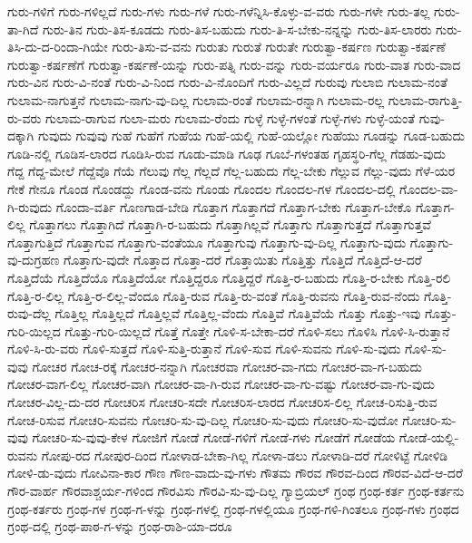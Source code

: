 {ಗುರು-ಗಳಿಗೆ
ಗುರು-ಗಳಿಲ್ಲದೆ
ಗುರು-ಗಳು
ಗುರು-ಗಳೆ
ಗುರು-ಗಳೆನ್ನಿಸಿ-ಕೊಳ್ಳು-ವ-ವರು
ಗುರು-ಗಳೇ
ಗುರು-ತಲ್ಲ
ಗುರು-ತಾ-ಗಿದೆ
ಗುರು-ತಿನ
ಗುರು-ತಿಸ-ಕೂಡದು
ಗುರು-ತಿಸ-ಬಹುದು
ಗುರು-ತಿ-ಸ-ಬೇಕು-ನನ್ನನ್ನು
ಗುರು-ತಿಸ-ಲಾರರು
ಗುರು-ತಿಸಿ-ದು-ದ-ರಿಂದಾ-ಗಿಯೇ
ಗುರು-ತಿಸು-ವ-ವನು
ಗುರುತು
ಗುರುತೆ
ಗುರುತೇ
ಗುರುತ್ವಾ-ಕರ್ಷಣ
ಗುರುತ್ವಾ-ಕರ್ಷಣೆ
ಗುರುತ್ವಾ-ಕರ್ಷಣೆಗೆ
ಗುರುತ್ವಾ-ಕರ್ಷಣೆ-ಯನ್ನು
ಗುರು-ಪತ್ನಿ
ಗುರು-ವನ್ನು
ಗುರು-ವರ್ಯರೂ
ಗುರು-ವಾತ
ಗುರು-ವಾದ
ಗುರು-ವಿನ
ಗುರು-ವಿ-ನಂತೆ
ಗುರು-ವಿ-ನಿಂದ
ಗುರು-ವಿ-ನೊಂದಿಗೆ
ಗುರು-ವಿಲ್ಲದೆ
ಗುರುವು
ಗುಲಾಬಿ
ಗುಲಾಮ-ನಂತೆ
ಗುಲಾಮ-ನಾಗುತ್ತನೆ
ಗುಲಾಮ-ನಾಗು-ವು-ದಿಲ್ಲ
ಗುಲಾಮ-ರಂತೆ
ಗುಲಾಮ-ರನ್ನಾಗಿ
ಗುಲಾಮ-ರಲ್ಲ
ಗುಲಾಮ-ರಾಗುತ್ತಿ-ರು-ವರು
ಗುಲಾಮ-ರಾಗುವ
ಗುಲಾ-ಮರು
ಗುಲಾಮ-ರೆಂದು
ಗುಳ್ಳೆ
ಗುಳ್ಳೆ-ಗಳಂತೆ
ಗುಳ್ಳೆ-ಗಳು
ಗುಳ್ಳೆ-ಯಂತೆ
ಗುವು-ದಕ್ಕಾಗಿ
ಗುವುದು
ಗುವುವು
ಗುಹೆ
ಗುಹೆಗೆ
ಗುಹೆಯ
ಗುಹೆ-ಯಲ್ಲಿ
ಗುಹೆ-ಯಲ್ಲೋ
ಗುಹೆಯು
ಗೂಡನ್ನು
ಗೂಡ-ಬಹುದು
ಗೂಡಿ-ನಲ್ಲಿ
ಗೂಡಿಸ-ಲಾರದ
ಗೂಡಿಸಿ-ರುವ
ಗೂಡು-ಮಾಡಿ
ಗೂಢ
ಗೂಬೆ-ಗಳಂತಹ
ಗೃಹಸ್ಥರಿ-ಗೆಲ್ಲ
ಗೆಡಹು-ವುದು
ಗೆದ್ದ
ಗೆದ್ದ-ಮೇಲೆ
ಗೆದ್ದೆವೊ
ಗೆಯೆ
ಗೆಲುವು
ಗೆಲ್ಲ
ಗೆಲ್ಲದೆ
ಗೆಲ್ಲ-ಬಹುದು
ಗೆಲ್ಲ-ಬೇಕು
ಗೆಲ್ಲುವ
ಗೆಲ್ಲು-ವುದು
ಗೆಳೆ-ಯರ
ಗೇಕೆ
ಗೇನೂ
ಗೊಂಡ
ಗೊಂಡದ್ದು
ಗೊಂಡ-ವನು
ಗೊಂಡು
ಗೊಂದಲ
ಗೊಂದಲ-ಗಳ
ಗೊಂದಲ-ದಲ್ಲಿ
ಗೊಂದಲ-ವಾ-ಗಿ-ರುವುದು
ಗೊಂದಾ-ವರ್ತಿ
ಗೊಣಗಾಡ-ಬೇಡಿ
ಗೊತ್ತಾಗ
ಗೊತ್ತಾಗದೆ
ಗೊತ್ತಾಗ-ಬೇಕು
ಗೊತ್ತಾಗ-ಬೇಕೊ
ಗೊತ್ತಾಗ-ಲಿಲ್ಲ
ಗೊತ್ತಾಗಲು
ಗೊತ್ತಾಗಿದೆ
ಗೊತ್ತಾಗಿ-ರ-ಬಹುದು
ಗೊತ್ತಾಗಿಲ್ಲವೆ
ಗೊತ್ತಾಗು
ಗೊತ್ತಾಗುತ್ತದೆ
ಗೊತ್ತಾಗುತ್ತವೆ
ಗೊತ್ತಾಗುತ್ತಿದೆ
ಗೊತ್ತಾಗುವ
ಗೊತ್ತಾಗು-ವಂತೆಯೂ
ಗೊತ್ತಾಗುವು
ಗೊತ್ತಾಗು-ವು-ದಿಲ್ಲ
ಗೊತ್ತಾಗು-ವುದು
ಗೊತ್ತಾಗು-ವು-ದುಗ್ರಹಣ
ಗೊತ್ತಾಗು-ವುದೇ
ಗೊತ್ತಾದ
ಗೊತ್ತಾ-ದರೆ
ಗೊತ್ತಾಯಿತು
ಗೊತ್ತಿತ್ತು
ಗೊತ್ತಿದೆ
ಗೊತ್ತಿದೆ-ಆ-ದರೆ
ಗೊತ್ತಿದೆಯೆ
ಗೊತ್ತಿದೆಯೊ
ಗೊತ್ತಿದೆಯೋ
ಗೊತ್ತಿದ್ದರೂ
ಗೊತ್ತಿದ್ದರೆ
ಗೊತ್ತಿ-ರ-ಬಹುದು
ಗೊತ್ತಿ-ರ-ಬೇಕು
ಗೊತ್ತಿ-ರಲಿ
ಗೊತ್ತಿ-ರ-ಲಿಲ್ಲ
ಗೊತ್ತಿ-ರ-ಲಿಲ್ಲ-ವೆಂದೂ
ಗೊತ್ತಿ-ರುವ
ಗೊತ್ತಿ-ರು-ವಂತೆ
ಗೊತ್ತಿ-ರುವನು
ಗೊತ್ತಿ-ರುವ-ನೆಂದು
ಗೊತ್ತಿ-ರುವು-ದೆಲ್ಲ
ಗೊತ್ತಿಲ್ಲ
ಗೊತ್ತಿಲ್ಲದೆ
ಗೊತ್ತಿಲ್ಲವೆ
ಗೊತ್ತಿಲ್ಲ-ವೆಂದು
ಗೊತ್ತಿವೆ
ಗೊತ್ತಿವೆಯೆ
ಗೊತ್ತು
ಗೊತ್ತು-ಇವು
ಗೊತ್ತು-ಗುರಿ-ಯಿಲ್ಲದ
ಗೊತ್ತು-ಗುರಿ-ಯಿಲ್ಲದೆ
ಗೊತ್ತೆ
ಗೊತ್ತೇ
ಗೊಳಿ-ಸ-ಬೇಕಾ-ದರೆ
ಗೊಳಿ-ಸಲು
ಗೊಳಿಸಿ
ಗೊಳಿ-ಸಿ-ರುತ್ತಾನೆ
ಗೊಳಿ-ಸಿ-ರು-ವರು
ಗೊಳಿ-ಸುತ್ತದೆ
ಗೊಳಿ-ಸುತ್ತಿ-ರುತ್ತಾನೆ
ಗೊಳಿ-ಸುವ
ಗೊಳಿ-ಸುವನು
ಗೊಳಿ-ಸು-ವುದು
ಗೊಳಿ-ಸು-ವುವು
ಗೋಚರ
ಗೋಚ-ರಕ್ಕೆ
ಗೋಚರ-ನನ್ನಾಗಿ
ಗೋಚರವಾ
ಗೋಚರ-ವಾ-ಗದು
ಗೋಚರ-ವಾ-ಗ-ಬಹುದು
ಗೋಚರ-ವಾಗ-ಲಿಲ್ಲ
ಗೋಚರ-ವಾಗಿ
ಗೋಚರ-ವಾ-ಗಿ-ರುವ
ಗೋಚರ-ವಾ-ಗು-ವಷ್ಟು
ಗೋಚರ-ವಾ-ಗು-ವುದು
ಗೋಚರ-ವಿಲ್ಲ-ದು-ದರ
ಗೋಚರಿಸ
ಗೋಚರಿ-ಸದೇ
ಗೋಚರಿಸ-ಲಾರದ
ಗೋಚರಿಸ-ಲಿಲ್ಲ
ಗೋಚ-ರಿಸುತ್ತಿ-ರುವ
ಗೋಚ-ರಿಸುವ
ಗೋಚರಿ-ಸುವನು
ಗೋಚರಿ-ಸು-ವು-ದಿಲ್ಲ
ಗೋಚರಿ-ಸು-ವುದು
ಗೋಚರಿ-ಸು-ವುದೋ
ಗೋಚರಿ-ಸು-ವುವು
ಗೋಚರಿ-ಸು-ವುವು-ಕೇಳ
ಗೋಜಿಗೆ
ಗೋಡೆ
ಗೋಡೆ-ಗಳಿಗೆ
ಗೋಡೆ-ಗಳು
ಗೋಡೆಗೆ
ಗೋಡೆಯ
ಗೋಡೆ-ಯಲ್ಲಿ-ರುವನು
ಗೋಪು-ರದ
ಗೋಪುರ-ದಿಂದ
ಗೋಳಾಡ-ಬೇಕಾ-ಗಿಲ್ಲ
ಗೋಳಾ-ಡಲು
ಗೋಳಾಡಿ-ದರೆ
ಗೋಳಿಟ್ಟೆ
ಗೋಳಿಡಿ
ಗೋಳಿ-ಡು-ವುದು
ಗೋವಿನಾ-ಕಾರ
ಗೌಣ
ಗೌಣ-ವಾದು-ವು-ಗಳು
ಗೌತಮ
ಗೌರವ
ಗೌರವ-ದಿಂದ
ಗೌರವ-ವಿದೆ-ಆ-ದರೆ
ಗೌರ-ವಾರ್ಹ
ಗೌರವಾಶ್ಚರ್ಯ-ಗಳಿಂದ
ಗೌರವಿಸು
ಗೌರವಿ-ಸು-ವು-ದಿಲ್ಲ
ಗ್ಯಾಬ್ರಿಯಲ್
ಗ್ರಂಥ
ಗ್ರಂಥ-ಕರ್ತ
ಗ್ರಂಥ-ಕರ್ತನು
ಗ್ರಂಥ-ಕರ್ತರು
ಗ್ರಂಥ-ಗಳ
ಗ್ರಂಥ-ಗ-ಳನ್ನು
ಗ್ರಂಥ-ಗಳಲ್ಲಿ
ಗ್ರಂಥ-ಗಳಲ್ಲಿಯೂ
ಗ್ರಂಥ-ಗಳಿ-ಗಿಂತಲೂ
ಗ್ರಂಥ-ಗಳು
ಗ್ರಂಥದ
ಗ್ರಂಥ-ದಲ್ಲಿ
ಗ್ರಂಥ-ಪಾಠ-ಗ-ಳನ್ನು
ಗ್ರಂಥ-ರಾಶಿ-ಯಾ-ದರೂ
}
